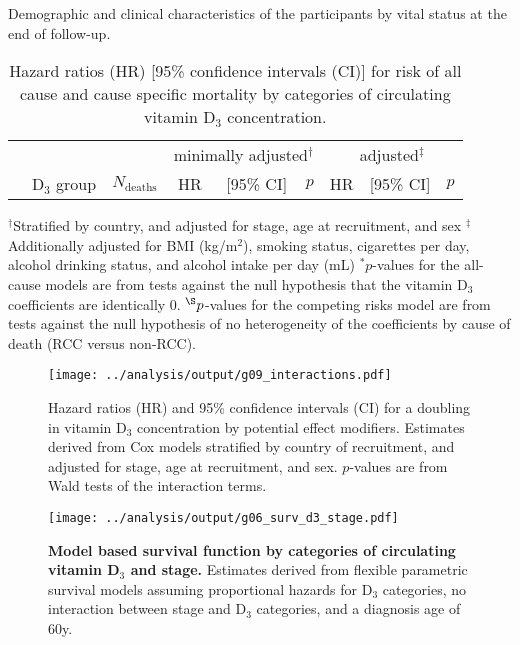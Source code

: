 \documentclass[a4paper,10pt]{article}
\begin{document}
\begin{table}
\caption{Demographic and clinical characteristics of the participants by vital 
status at the end of follow-up.}
\centering

\end{table}

\clearpage 
\begin{table}
\caption{Hazard ratios (HR) [95\% confidence intervals (CI)] for risk of all 
cause and cause specific mortality by categories of circulating vitamin D$_3$ 
concentration.}
\begin{tabular}{lrrrrrrrr}
\toprule
& & &\multicolumn{3}{c}{minimally adjusted$^\dag$} & 
\multicolumn{3}{c}{adjusted$^\ddag$} \\
 \cmidrule(r){4-6} \cmidrule(l){7-9} 
& D$_3$ group & $N_{\text{deaths}}$ & HR & [95\% CI] & $p$ & HR & [95\% CI] & 
$p$ \\
\midrule

\bottomrule
\end{tabular}
\newline
{\footnotesize 
$^\dag$Stratified by country, and adjusted for stage, age at recruitment, and 
sex \newline
$^\ddag$Additionally adjusted for BMI (kg/m$^2$), smoking status, cigarettes 
per day, alcohol drinking status, and alcohol intake per day (mL) \newline
$^*p$-values for the all-cause models are from tests against the null 
hypothesis that the vitamin D$_3$ coefficients are identically 0. 
\newline
$^{\S}p$-values for the competing risks model are from tests against the null 
hypothesis of no heterogeneity of the coefficients by cause of death (RCC 
versus non-RCC).
}
\end{table}
\clearpage

\begin{figure}
 \centering
\caption{Hazard ratios (HR) and 95\% confidence intervals (CI) for a 
doubling in vitamin D$_3$ concentration by potential effect modifiers. 
\footnotesize{Estimates derived from Cox models stratified by country of 
recruitment, and adjusted for stage, age at recruitment, and sex. $p$-values 
are from Wald tests of the interaction terms.}}
\texttt{[image: ../analysis/output/g09\_interactions.pdf]}
\end{figure}


\begin{figure}
 \centering 
\caption{\textbf{Model based survival function by categories of 
circulating 
vitamin D$_3$ and stage.} \footnotesize{Estimates derived from flexible 
parametric survival models assuming proportional hazards for D$_3$ categories, 
no 
interaction between stage and D$_3$ categories, and a diagnosis age of 60y.}} 
\texttt{[image: ../analysis/output/g06\_surv\_d3\_stage.pdf]}
\end{figure}
\end{document}
